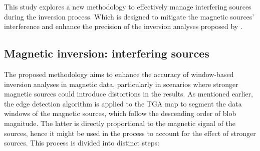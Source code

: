 

This study explores a new methodology to effectively manage interfering sources during the inversion process. Which is designed to mitigate the magnetic sources' interference and enhance the precision of the inversion analyses proposed by \citet{Souza-Junior2023b}.

\subsection{Magnetic inversion: interfering sources}


The proposed methodology aims to enhance the accuracy of window-based inversion analyses in magnetic data, particularly in scenarios where stronger magnetic sources could introduce distortions in the results. As mentioned earlier, the edge detection algorithm is applied to the TGA map to segment the data windows of the magnetic sources, which follow the descending order of blob magnitude. The latter is directly proportional to the magnetic signal of the sources, hence it might be used in the process to account for the effect of stronger sources. This process is divided into distinct steps:

